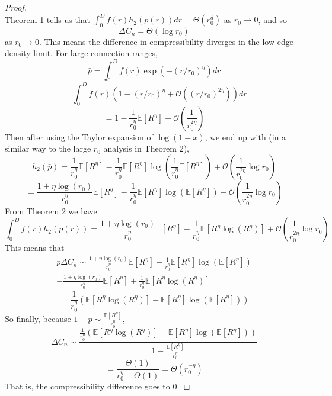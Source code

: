 \documentclass{article}
\newcommand{\bigO}[1]{\mathcal{O}\left(#1\right)}
\newcommand{\ttz}[0]{\rightarrow 0}
\begin{document}
\begin{proof}
\begin{equation}
    \end{equation}
    Theorem 1 tells us that $\int_0^D f(r)h_2(p(r))dr = \Theta(r_0^d)$ as $r_0 \ttz$, and so
    \begin{equation}
        \Delta C_n = \Theta(\log r_0) 
    \end{equation}
     as $r_0 \ttz$. This means the difference in compressibility diverges in the low edge density limit.
     For large connection ranges,
    \begin{equation}
    \bar{p} = \int_0^Df(r)\exp(-(r/r_0)^{\eta})dr
\end{equation}
\begin{equation}
    = \int_0^Df(r)(1-(r/r_0)^{\eta}+\bigO{(r/r_0)^{2\eta}})dr
\end{equation}
\begin{equation}
    = 1 - \frac{1}{r_0^{\eta}}\mathbb{E}[R^{\eta}] + \bigO{\frac{1}{r_0^{2\eta}}}
\end{equation}
Then after using the Taylor expansion of $\log(1-x)$, we end up with (in a similar way to the large $r_0$ analysis in Theorem 2),
\begin{equation}
    h_2(\bar{p}) = \frac{1}{r_0^{\eta}}\mathbb{E}[R^{\eta}] - \frac{1}{r_0^{\eta}}\mathbb{E}[R^{\eta}]\log\left(\frac{1}{r_0^{\eta}}\mathbb{E}[R^{\eta}]\right) + \bigO{\frac{1}{r_0^{2\eta}}{\log r_0}}
\end{equation}
\begin{equation}
    = \frac{1+\eta\log(r_0)}{r_0^{\eta}}\mathbb{E}[R^{\eta}] - \frac{1}{r_0^{\eta}}\mathbb{E}[R^{\eta}]\log(\mathbb{E}[R^{\eta}]) + \bigO{\frac{1}{r_0^{2\eta}}\log r_0}
\end{equation}
From Theorem 2 we have
\begin{equation}
    \int_0^Df(r)h_2(p(r)) = \frac{1+\eta\log(r_0)}{r_0^{\eta}}\mathbb{E}[R^{\eta}] - \frac{1}{r_0^{\eta}}\mathbb{E}[R^{\eta}\log(R^{\eta})] + \bigO{\frac{1}{r_0^{2\eta}}\log r_0}
\end{equation}
This means that
\begin{gather}
    \bar{p}\Delta C_n \sim \frac{1+\eta\log(r_0)}{r_0^{\eta}}\mathbb{E}[R^{\eta}] - \frac{1}{r_0^{\eta}}\mathbb{E}[R^{\eta}]\log(\mathbb{E}[R^{\eta}]) \nonumber \\ 
    - \frac{1+\eta\log(r_0)}{r_0^{\eta}}\mathbb{E}[R^{\eta}] + \frac{1}{r_0^{\eta}}\mathbb{E}[R^{\eta}\log(R^{\eta})]
\end{gather}
\begin{equation}
    = \frac{1}{r_0^{\eta}}\left(\mathbb{E}[R^{\eta}\log(R^{\eta})] - \mathbb{E}[R^{\eta}]\log(\mathbb{E}[R^{\eta}]) \right)
\end{equation}
So finally, because $1 - \bar{p} \sim \frac{\mathbb{E}[R^{\eta}]}{r_0^{\eta}}$,
\begin{equation}
    \Delta C_n \sim \frac{\frac{1}{r_0^{\eta}}\left(\mathbb{E}[R^{\eta}\log(R^{\eta})] - \mathbb{E}[R^{\eta}]\log(\mathbb{E}[R^{\eta}]) \right)}{1-\frac{\mathbb{E}[R^{\eta}]}{r_0^{\eta}}}
\end{equation}
\begin{equation}
    = \frac{\Theta(1)}{r_0^{\eta}-\Theta(1)} = \Theta(r_0^{-\eta})
\end{equation}
That is, the compressibility difference goes to 0.
\end{proof}
\end{document}
